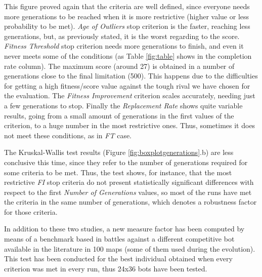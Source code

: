 \documentclass[runningheads,a4paper]{llncs}
\begin{document}


This figure proved again that the criteria are well defined, since everyone needs more generations to be reached when it is more restrictive (higher value or less probability to be met). \textit{Age of Outliers} stop criterion is the faster, reaching less generations, but, as previously stated, it is the worst regarding to the score.  \textit{Fitness Threshold} stop criterion needs more generations to finish, and even it never meets some of the conditions (as Table \ref{fig:table} shows in the completion rate column). The maximum score (around 27) is obtained in a number of generations close to the final limitation (500). This happens due to the difficulties for getting a high fitness/score value against the tough rival we have chosen for the evaluation. The \textit{Fitness Improvement} criterion scales accurately, needing just a few generations to stop. Finally the \textit{Replacement Rate} shows quite variable results, going from a small amount of generations in the first values of the criterion, to  a huge number in the most restrictive ones. Thus, sometimes it does not meet these conditions, as in \textit{FT} case.

The Kruskal-Wallis test results (Figure \ref{fig:boxplotgenerations}.b) are less conclusive this time, since they refer to the number of generations required for some criteria to be met. Thus, the test shows, for instance, that the most restrictive \textit{FI} stop criteria do not present statistically significant differences with respect to the first \textit{Number of Generations} values, so most of the runs have met the criteria in the same number of generations, which denotes a robustness factor for those criteria. %



In addition to these two studies, a new measure factor has been
computed by means of a benchmark based in battles against a different competitive bot
available in the literature \cite{DBLP:conf/cig/Fernandez-AresGMG12:anon} in 100 maps (some of them used during the evolution). This test has been conducted for the best individual obtained when every criterion was met in every run, thus 24x36 bots have been tested.
\end{document}
